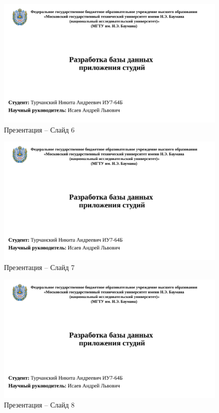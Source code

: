 \begin{appendices}
\begin{figure}[h]
	\begin{center}
		\includegraphics[page=6, width=\linewidth]{presentation.pdf}
	\end{center}
	\caption{Презентация -- Слайд 6}
\end{figure}

\begin{figure}[h]
	\begin{center}
		\includegraphics[page=7, width=\linewidth]{presentation.pdf}
	\end{center}
	\caption{Презентация -- Слайд 7}
\end{figure}

\begin{figure}[h]
	\begin{center}
		\includegraphics[page=8, width=\linewidth]{presentation.pdf}
	\end{center}
	\caption{Презентация -- Слайд 8}
\end{figure}


\end{appendices}
